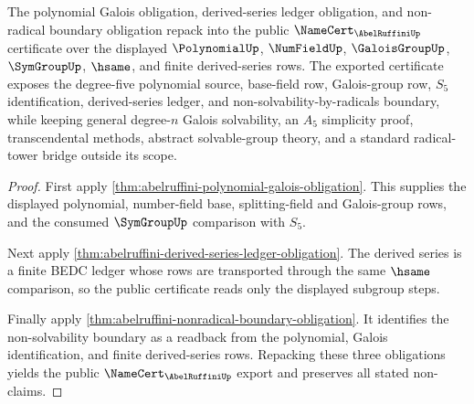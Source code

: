 \begin{theorem}
\label{thm:abelruffini-public-certificate-export}
The polynomial Galois obligation, derived-series ledger obligation, and
non-radical boundary obligation repack into the public
$\NameCert_{\AbelRuffiniUp}$ certificate over the displayed $\PolynomialUp$,
$\NumFieldUp$, $\GaloisGroupUp$, $\SymGroupUp$, $\hsame$, and finite
derived-series rows. The exported certificate exposes the degree-five
polynomial source, base-field row, Galois-group row, $S_5$ identification,
derived-series ledger, and non-solvability-by-radicals boundary, while keeping
general degree-$n$ Galois solvability, an $A_5$ simplicity proof,
transcendental methods, abstract solvable-group theory, and a standard
radical-tower bridge outside its scope.
\end{theorem}
\begin{proof}
First apply
\autoref{thm:abelruffini-polynomial-galois-obligation}. This supplies the
displayed polynomial, number-field base, splitting-field and Galois-group rows,
and the consumed $\SymGroupUp$ comparison with $S_5$.

Next apply
\autoref{thm:abelruffini-derived-series-ledger-obligation}. The derived series
is a finite BEDC ledger whose rows are transported through the same $\hsame$
comparison, so the public certificate reads only the displayed subgroup steps.

Finally apply
\autoref{thm:abelruffini-nonradical-boundary-obligation}. It identifies the
non-solvability boundary as a readback from the polynomial, Galois
identification, and finite derived-series rows. Repacking these three
obligations yields the public $\NameCert_{\AbelRuffiniUp}$ export and preserves
all stated non-claims.
\end{proof}

